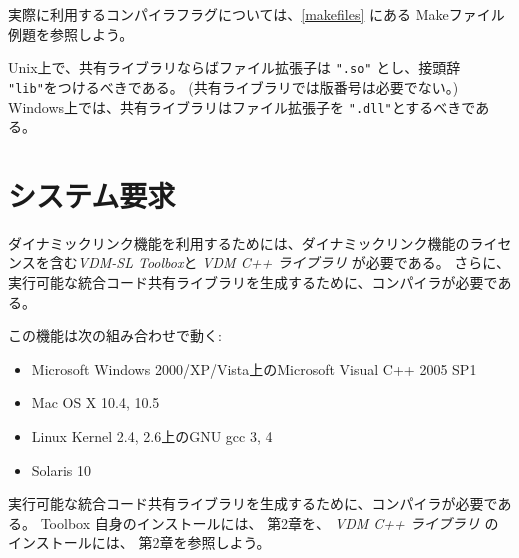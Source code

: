 \documentclass[\pformat,12pt]{jarticle}
\begin{document}
実際に利用するコンパイラフラグについては、\ref{makefiles} にある Makeファイル例題を参照しよう。

Unix上で、共有ライブラリならばファイル拡張子は {\tt ".so"} とし、接頭辞 {\tt "lib"}をつけるべきである。
(共有ライブラリでは版番号は必要でない。) 
 Windows上では、共有ライブラリはファイル拡張子を \texttt{".dll"}とするべきである。

\newpage


\newpage
\appendix

\section{システム要求}
\label{sec:sysreq}

ダイナミックリンク機能を利用するためには、ダイナミックリンク機能のライセンスを含む{\it VDM-SL Toolbox}と {\it VDM C++ ライブラリ} が必要である。
さらに、実行可能な統合コード共有ライブラリを生成するために、コンパイラが必要である。

この機能は次の組み合わせで動く:
\begin{itemize}
\item Microsoft Windows 2000/XP/Vista上のMicrosoft Visual C++ 2005 SP1
\item Mac OS X 10.4, 10.5
\item Linux Kernel 2.4, 2.6上のGNU gcc 3, 4
\item Solaris 10
\end{itemize}

実行可能な統合コード共有ライブラリを生成するために、コンパイラが必要である。 
Toolbox 自身のインストールには、 \cite{UserMan-SCSK}第2章を、 {\it VDM C++ ライブラリ} のインストールには、 \cite{CGMan-SCSK}第2章を参照しよう。
\end{document}
